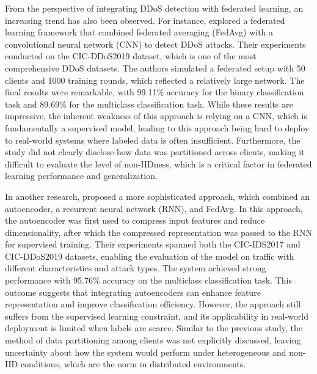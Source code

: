 From the perspective of integrating DDoS detection with federated learning, an increasing trend has also been observed. For instance, \cite{9816297} explored a federated learning framework that combined federated averaging (FedAvg) with a convolutional neural network (CNN) to detect DDoS attacks. Their experiments conducted on the CIC-DDoS2019 dataset, which is one of the most comprehensive DDoS datasets. The authors simulated a federated setup with 50 clients and 1000 training rounds, which reflected a relatively large network. The final results were remarkable, with 99.11\% accuracy for the binary classification task and 89.69\% for the multiclass classification task. While these results are impressive, the inherent weakness of this approach is relying on a CNN, which is fundamentally a supervised model, leading to this approach being hard to deploy to real-world systems where labeled data is often insufficient. Furthermore, the study did not clearly disclose how data was partitioned across clients, making it difficult to evaluate the level of non-IIDness, which is a critical factor in federated learning performance and generalization.

In another research, \cite{9724339} proposed a more sophisticated approach, which combined an autoencoder, a recurrent neural network (RNN), and FedAvg. In this approach, the autoencoder was first used to compress input features and reduce dimensionality, after which the compressed representation was passed to the RNN for supervised training. Their experiments spanned both the CIC-IDS2017 and CIC-DDoS2019 datasets, enabling the evaluation of the model on traffic with different characteristics and attack types. The system achieved strong performance with 95.76\% accuracy on the multiclass classification task. This outcome suggests that integrating autoencoders can enhance feature representation and improve classification efficiency. However, the approach still suffers from the supervised learning constraint, and its applicability in real-world deployment is limited when labels are scarce. Similar to the previous study, the method of data partitioning among clients was not explicitly discussed, leaving uncertainty about how the system would perform under heterogeneous and non-IID conditions, which are the norm in distributed environments.


